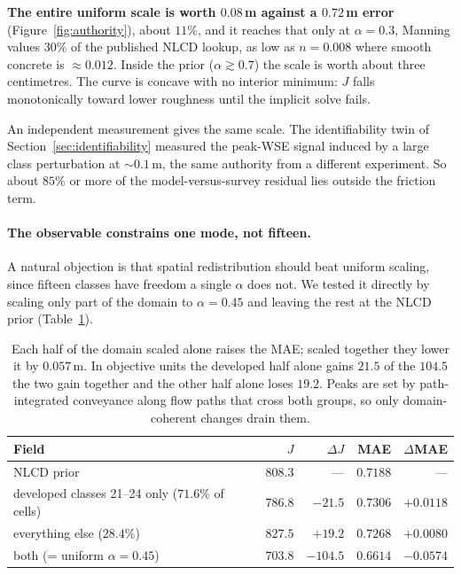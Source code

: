 \documentclass[11pt]{article}
\begin{document}
\textbf{The entire uniform scale is worth $0.08$\,m against a
$0.72$\,m error} (Figure~\ref{fig:authority}), about $11\%$, and it
reaches that only at $\alpha = 0.3$, Manning values $30\%$ of the
published NLCD lookup, as low as $n = 0.008$ where smooth concrete is
$\approx 0.012$. Inside the prior ($\alpha \gtrsim 0.7$) the scale is
worth about three centimetres. The curve is concave with no interior
minimum: $J$ falls monotonically toward lower roughness until the
implicit solve fails.

An independent measurement gives the same scale. The identifiability
twin of Section~\ref{sec:identifiability} measured the peak-WSE
signal induced by a large class perturbation at $\sim 0.1$\,m, the
same authority from a different experiment. So about $85\%$ or more
of the model-versus-survey residual lies outside the friction term.

\paragraph{The observable constrains one mode, not fifteen.}
A natural objection is that spatial redistribution should beat uniform
scaling, since fifteen classes have freedom a single $\alpha$ does
not. We tested it directly by scaling only part of the domain to
$\alpha = 0.45$ and leaving the rest at the NLCD prior
(Table~\ref{tab:halves}).

\begin{table}
\centering\small
\begin{tabular}{@{}lrrrr@{}}
\toprule
Field & $J$ & $\Delta J$ & MAE & $\Delta$MAE \\
\midrule
NLCD prior & $808.3$ & --- & $0.7188$ & --- \\
developed classes 21--24 only ($71.6\%$ of cells) & $786.8$ & $-21.5$ & $0.7306$ & $+0.0118$ \\
everything else ($28.4\%$) & $827.5$ & $+19.2$ & $0.7268$ & $+0.0080$ \\
both (= uniform $\alpha = 0.45$) & $703.8$ & $-104.5$ & $0.6614$ & $-0.0574$ \\
\bottomrule
\end{tabular}
\caption{Each half of the domain scaled alone raises the MAE;
scaled together they lower it by $0.057$\,m. In objective units the
developed half alone gains $21.5$ of the $104.5$ the two gain together
and the other half alone loses $19.2$. Peaks are set by path-integrated
conveyance along flow paths that cross both groups, so only
domain-coherent changes drain them.}
\label{tab:halves}
\end{table}
\end{document}
